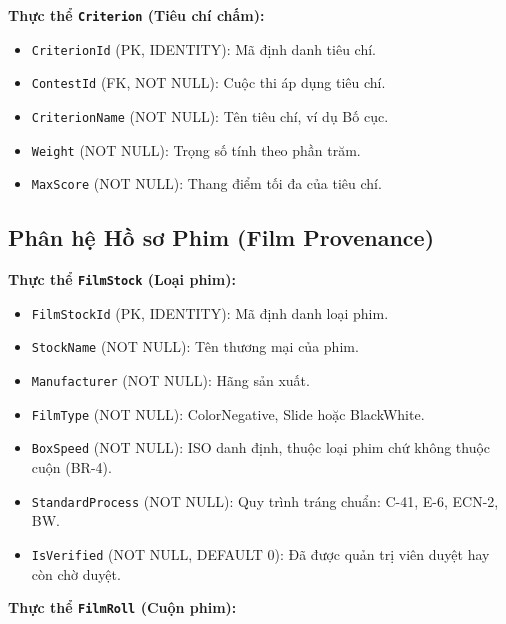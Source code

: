 \noindent\textbf{Thực thể \texttt{Criterion} (Tiêu chí chấm):}

\begin{itemize}
    \item \texttt{CriterionId} (PK, IDENTITY): Mã định danh tiêu chí.
    \item \texttt{ContestId} (FK, NOT NULL): Cuộc thi áp dụng tiêu chí.
    \item \texttt{CriterionName} (NOT NULL): Tên tiêu chí, ví dụ Bố cục.
    \item \texttt{Weight} (NOT NULL): Trọng số tính theo phần trăm.
    \item \texttt{MaxScore} (NOT NULL): Thang điểm tối đa của tiêu chí.
\end{itemize}

\subsection{Phân hệ Hồ sơ Phim (Film Provenance)}

\noindent\textbf{Thực thể \texttt{FilmStock} (Loại phim):}

\begin{itemize}
    \item \texttt{FilmStockId} (PK, IDENTITY): Mã định danh loại phim.
    \item \texttt{StockName} (NOT NULL): Tên thương mại của phim.
    \item \texttt{Manufacturer} (NOT NULL): Hãng sản xuất.
    \item \texttt{FilmType} (NOT NULL): ColorNegative, Slide hoặc BlackWhite.
    \item \texttt{BoxSpeed} (NOT NULL): ISO danh định, thuộc loại phim chứ không thuộc cuộn (BR-4).
    \item \texttt{StandardProcess} (NOT NULL): Quy trình tráng chuẩn: C-41, E-6, ECN-2, BW.
    \item \texttt{IsVerified} (NOT NULL, DEFAULT 0): Đã được quản trị viên duyệt hay còn chờ duyệt.
\end{itemize}

\noindent\textbf{Thực thể \texttt{FilmRoll} (Cuộn phim):}

